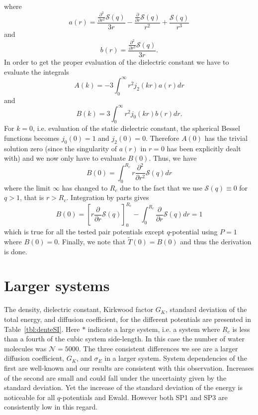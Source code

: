 \documentclass[
journal=jctcce,
manuscript=letter]{achemso}
\begin{document}
where
\begin{equation}
\label{eq:T2_exp_a}
a(r) = \frac{\frac{\partial^2}{\partial r^2}\mathcal{S}(q)}{3r} - \frac{\frac{\partial}{\partial r}\mathcal{S}(q)}{r^2} + \frac{\mathcal{S}(q)}{r^3}
\end{equation}
and
\begin{equation}
\label{eq:T2_exp_b}
b(r) = \frac{\frac{\partial^2}{\partial r^2}\mathcal{S}(q)}{3r}.
\end{equation}
In order to get the proper evaluation of the dielectric constant we have to evaluate the integrals\cite{neumann1986computer}
\begin{equation}
A(k) = -3\int_{0}^{\infty}r^2j_2(kr)a(r)dr
\end{equation}
and
\begin{equation}
B(k) = 3\int_{0}^{\infty}r^2j_0(kr)b(r)dr.
\end{equation}
For $k=0$, i.e. evaluation of the static dielectric constant, the spherical Bessel functions becomes $j_0(0) = 1$ and $j_2(0) = 0$. Therefore $A(0)$ has the trivial solution zero (since the singularity of $a(r)$ in $r=0$ has been explicitly dealt with\cite{neumann1986computer}) and we now only have to evaluate $B(0)$. Thus, we have
\begin{equation}
B(0) = \int_{0}^{R_c}r\frac{\partial^2}{\partial r^2}\mathcal{S}(q)dr
\end{equation}
where the limit $\infty$ has changed to $R_c$ due to the fact that we use $\mathcal{S}(q) \equiv 0$ for $q>1$, that is $r> R_c$. Integration by parts gives
\begin{equation}
B(0) = \left[r\frac{\partial}{\partial r}\mathcal{S}(q) \right]_{0}^{R_c} - \int_0^{R_c}\frac{\partial}{\partial r}\mathcal{S}(q)dr = 1
\end{equation}
which is true for all the tested pair potentials except $q$-potential using $P=1$ where $B(0)=0$. Finally, we note that $\tilde{T}(0) = B(0)$ and thus the derivation is done. 

\section{Larger systems}
The density, dielectric constant, Kirkwood factor $G_K$, standard deviation of the total energy, and diffusion coefficient, for the different potentials are presented in Table~\ref{tbl:denteSI}. Here $*$ indicate a large system, i.e. a system where $R_c$ is less than a fourth of the cubic system side-length. In this case the number of water molecules was $\mathcal{N}=5000$. The three consistent differences we see are a larger diffusion coefficient, $G_K$, and $\sigma_E$ in a larger system. System dependencies of the first are well-known\cite{Tazi_2012} and our results are consistent with this observation. Increases of the second are small and could fall under the uncertainty given by the standard deviation. Yet the increase of the standard deviation of the energy is noticeable for all $q$-potentials and Ewald. However both SP1 and SP3 are consistently low in this regard.
\end{document}
